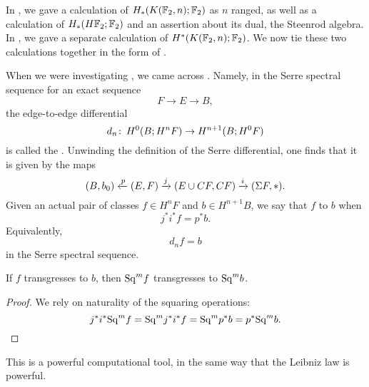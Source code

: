 
In , we gave a calculation of $H_*(K(\mathbb F_2, n); \mathbb F_2)$ as $n$ ranged, as well as a calculation of $H_*(H\mathbb F_2; \mathbb F_2)$ and an assertion about its dual, the Steenrod algebra.
In , we gave a separate calculation of $H^*(K(\mathbb F_2, n); \mathbb F_2)$.
We now tie these two calculations together in the form of .

\begin{definition}
When we were investigating , we came across .
Namely, in the Serre spectral sequence for an exact sequence \[F \to E \to B,\] the edge-to-edge differential \[d_n\colon\thinspace H^0(B; H^n F) \to H^{n+1}(B; H^0 F)\] is called the .
Unwinding the definition of the Serre differential, one finds that it is given by the maps \[(B, b_0) \xleftarrow p (E, F) \xrightarrow j (E \cup CF, CF) \xrightarrow i (\Sigma F, *).\]
Given an actual pair of classes $f \in H^n F$ and $b \in H^{n+1} B$, we say that $f$  to $b$ when \[j^* i^* f = p^* b.\]
Equivalently, \[d_n f = b\] in the Serre spectral sequence.
\end{definition}

\begin{lemma}\label{KudosThm}%
If $f$ transgresses to $b$, then $\mathrm{Sq}^m f$ transgresses to $\mathrm{Sq}^m b$.
\end{lemma}
\begin{proof}
We rely on naturality of the squaring operations: \[j^* i^* \mathrm{Sq}^m f = \mathrm{Sq}^m j^* i^* f = \mathrm{Sq}^m p^* b = p^* \mathrm{Sq}^m b. \qedhere\]
\end{proof}

This is a powerful computational tool, in the same way that the Leibniz law is powerful.

